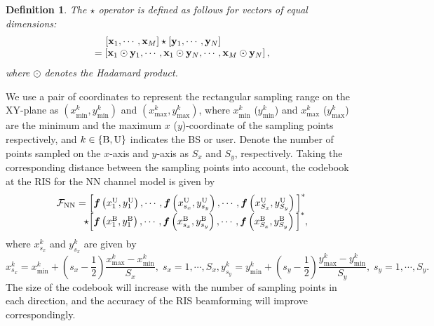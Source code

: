 \documentclass[lettersize, journal]{IEEEtran}
\newtheorem{myDef}{Definition}
\begin{document}
\begin{myDef}\label{Def_operation}
The $ \star $ operator is defined as follows for vectors of equal dimensions:
\begin{equation}\label{OperationStar}
\begin{array}{l}
\;\;\;\; \left[ {\bf{x}}_1, \cdots, {\bf{x}}_M \right] \star \left[ {\bf{y}}_1, \cdots,  {\bf{y}}_N \right]  \\
= \left[ {\bf{x}}_1\odot{\bf{y}}_1, \cdots, {\bf{x}}_1\odot{\bf{y}}_N, \cdots, {\bf{x}}_M\odot{\bf{y}}_N \right],
\end{array}
\end{equation}
where $\odot$ denotes the Hadamard product.
\end{myDef}
 
We use a pair of coordinates to represent the rectangular sampling range on the XY-plane as $\left( x^{k}_{\min}, y^{k}_{\min} \right)$ and $\left( x^{k}_{\max}, y^{k}_{\max} \right)$, where $x^{k}_{\min}$ ($y^{k}_{\min}$) and $x^{k}_{\max}$ ($y^{k}_{\max}$) are the minimum and the maximum $x$ ($y$)-coordinate of the sampling points respectively, and $k \in \left\{ {\rm{B}}, {\rm{U}}\right\}$ indicates the BS or user.
Denote the number of points sampled on the $x$-axis and $y$-axis as $S_x$ and $S_y$, respectively.
Taking the corresponding distance between the sampling points into account, the codebook at the RIS for the NN channel model is given by
\begin{equation}\label{Codebook_NN}
\begin{array}{l}
{\cal{F}}_{\rm{NN}} =  \Big[ {\bm{f}}\left( x_1^{\rm{U}}, y_1^{\rm{U}} \right), \cdots, {\bm{f}}\left( x_{s_x}^{\rm{U}}, y_{s_y}^{\rm{U}} \right), \cdots, {\bm{f}}\left( x_{S_x}^{\rm{U}}, y_{S_y}^{\rm{U}} \right) \Big]^*  \\ 
\;\;\;\; \;\;\;\; \;\; \star  \Big[ {\bm{f}}\left( x_1^{\rm{B}}, y_1^{\rm{B}} \right), \cdots, {\bm{f}}\left( x_{s_x}^{\rm{B}}, y_{s_y}^{\rm{B}} \right), \cdots, {\bm{f}}\left( x_{S_x}^{\rm{B}}, y_{S_y}^{\rm{B}} \right) \Big]^*,
\end{array}
\end{equation}
where $x_{s_x}^k$ and $y_{s_x}^k$ are given by
\begin{subequations}\label{RangeSampling}
\begin{equation}\label{RangeSampling_x}
x_{s_x}^{k} = x^{k}_{\min} + \left( s_x - \frac{1}{2} \right) \frac{{x^{k}_{\max} - x^{k}_{\min} }}{{S_x}}, \; s_x = 1,\cdots, S_x,
\end{equation}
\begin{equation}\label{RangeSampling_y}
y_{s_y}^{k} = y^{k}_{\min} + \left( s_y - \frac{1}{2} \right) \frac{{y^{k}_{\max} - y^{k}_{\min} }}{{S_y}}, \; s_y = 1,\cdots, S_y.
\end{equation}
\end{subequations}
The size of the codebook will increase with the number of sampling points in each direction, and the accuracy of the RIS beamforming will improve correspondingly.
\end{document}
